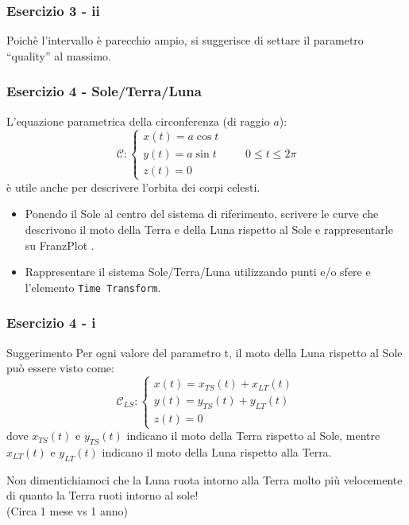 \documentclass{beamer}
\newcommand{\fig}{figures} %
\newcommand{\frnzplt}{FranzPlot }
\begin{document}
%
\begin{frame}
\frametitle{Esercizio 3 - ii}
\begin{center}
\end{center}
    Poich\`e l'intervallo \`e parecchio ampio, si suggerisce di settare il parametro ``quality'' al massimo.
\end{frame}

\begin{frame}
	\frametitle{Esercizio 4 - Sole/Terra/Luna}
	L'equazione parametrica della circonferenza (di raggio $a$):
	\begin{displaymath}
	\mathcal{C}:\begin{cases}
	x(t)= a \cos t\\
	y(t)= a \sin t\\
	z(t)= 0
	\end{cases}
	\qquad 0 \leq t \leq 2 \pi
	\end{displaymath}
	\`e utile anche per descrivere l'orbita dei corpi celesti.
	\begin{itemize}
		\item Ponendo il Sole al centro del sistema di riferimento, scrivere le curve che descrivono il moto della Terra e della Luna rispetto al Sole e rappresentarle su \frnzplt.
		\item Rappresentare il sistema Sole/Terra/Luna utilizzando punti e/o sfere e l'elemento \texttt{Time Transform}.
	\end{itemize}
\end{frame}

\begin{frame}
	\frametitle{Esercizio 4 - i}
	\begin{block}{Suggerimento}
		Per ogni valore del parametro t, il moto della Luna rispetto al Sole pu\`o essere visto come:
		\begin{displaymath}
		\mathcal{C}_{LS}:\begin{cases}
		x(t)= x_{TS}(t) + x_{LT}(t) \\
		y(t)= y_{TS}(t) + y_{LT}(t)\\
		z(t)= 0
		\end{cases}
		\end{displaymath}
		dove $x_{TS}(t)$ e $y_{TS}(t)$ indicano il moto della Terra rispetto al Sole, mentre 
		$x_{LT}(t)$ e $y_{LT}(t)$ indicano il moto della Luna rispetto alla Terra.

                Non dimentichiamoci che la Luna ruota intorno alla Terra molto pi\`u velocemente di quanto la Terra ruoti intorno al sole!\\
                (Circa 1 mese vs 1 anno)
	\end{block}
\end{frame}
\end{document}
